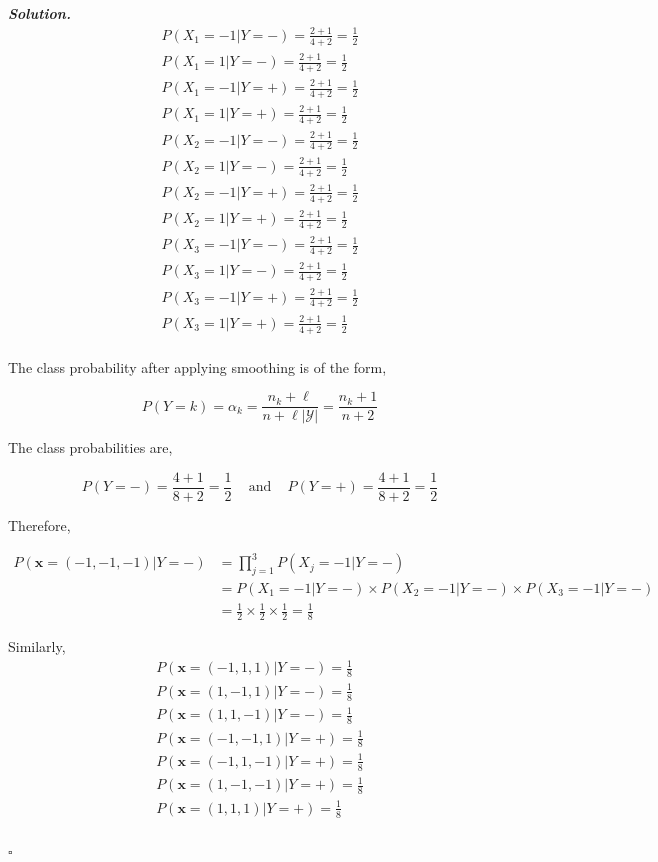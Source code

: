 \documentclass[8pt]{article}
\newenvironment{solution}[1][\it{Solution}]{\textbf{#1. } }{$\square$}
\begin{document}
\begin{solution}
$$
\begin{aligned}
    P(X_{1} = -1 | Y = -) = \frac{2 + 1}{4 + 2} = \frac{1}{2}\\
    P(X_{1} = 1 | Y = -) = \frac{2 + 1}{4 + 2} = \frac{1}{2}\\
    P(X_{1} = -1 | Y = +) = \frac{2 + 1}{4 + 2} = \frac{1}{2}\\
    P(X_{1} = 1 | Y = +) = \frac{2 + 1}{4 + 2} = \frac{1}{2}\\
    P(X_{2} = -1 | Y = -) = \frac{2 + 1}{4 + 2} = \frac{1}{2}\\
    P(X_{2} = 1 | Y = -) = \frac{2 + 1}{4 + 2} = \frac{1}{2}\\
    P(X_{2} = -1 | Y = +) = \frac{2 + 1}{4 + 2} = \frac{1}{2}\\
    P(X_{2} = 1 | Y = +) = \frac{2 + 1}{4 + 2} = \frac{1}{2}\\
    P(X_{3} = -1 | Y = -) = \frac{2 + 1}{4 + 2} = \frac{1}{2}\\
    P(X_{3} = 1 | Y = -) = \frac{2 + 1}{4 + 2} = \frac{1}{2}\\
    P(X_{3} = -1 | Y = +) = \frac{2 + 1}{4 + 2} = \frac{1}{2}\\
    P(X_{3} = 1 | Y = +) = \frac{2 + 1}{4 + 2} = \frac{1}{2}\\
\end{aligned}
$$

The class probability after applying smoothing is of the form,

$$
    P(Y = k) = \alpha_k = \frac{n_k + \ell}{n + \ell|\mathcal{Y}|} = \frac{n_k + 1}{n + 2}
$$

The class probabilities are,

$$
    P(Y = -) = \frac{4 + 1}{8 + 2} = \frac{1}{2} \,\,\,\,\,\,\,\text{and}\,\,\,\,\,\,\, P(Y = +) = \frac{4 + 1}{8 + 2} = \frac{1}{2}
$$

Therefore,

$$
\begin{aligned}
    P(\boldsymbol{x} = (-1, -1, -1) | Y = -) &= \prod_{j=1}^{3} P(X_j = -1 | Y = -)\\
    &= P(X_1 = -1 | Y = -) \times P(X_2 = -1 | Y = -) \times P(X_3 = -1 | Y = -)\\
    &= \frac{1}{2} \times \frac{1}{2} \times \frac{1}{2} = \frac{1}{8}
\end{aligned}
$$

Similarly,
$$
\begin{aligned}
    P(\boldsymbol{x} = (-1, 1, 1) | Y = -) = \frac{1}{8}\\
    P(\boldsymbol{x} = (1, -1, 1) | Y = -) = \frac{1}{8}\\
    P(\boldsymbol{x} = (1, 1, -1) | Y = -) = \frac{1}{8}\\
    P(\boldsymbol{x} = (-1, -1, 1) | Y = +) = \frac{1}{8}\\
    P(\boldsymbol{x} = (-1, 1, -1) | Y = +) = \frac{1}{8}\\
    P(\boldsymbol{x} = (1, -1, -1) | Y = +) = \frac{1}{8}\\
    P(\boldsymbol{x} = (1, 1, 1) | Y = +) = \frac{1}{8}\\
\end{aligned}
$$


\end{solution}
\end{document}
